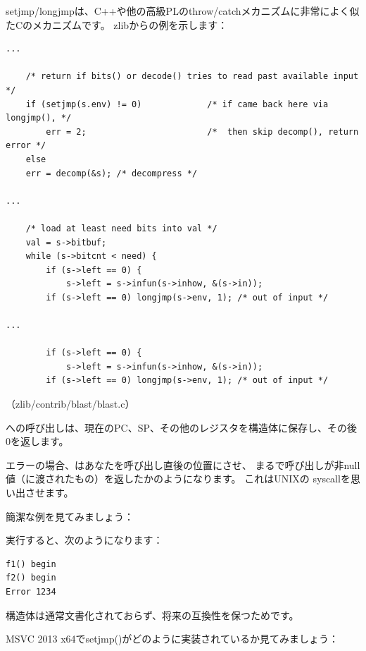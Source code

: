 

setjmp/longjmpは、C++や他の高級\ac{PL}のthrow/catchメカニズムに非常によく似たCのメカニズムです。
zlibからの例を示します：

\begin{lstlisting}[style=customc]
...

    /* return if bits() or decode() tries to read past available input */
    if (setjmp(s.env) != 0)             /* if came back here via longjmp(), */
        err = 2;                        /*  then skip decomp(), return error */
    else
	err = decomp(&s); /* decompress */

...

    /* load at least need bits into val */
    val = s->bitbuf;
    while (s->bitcnt < need) {
        if (s->left == 0) {
            s->left = s->infun(s->inhow, &(s->in));
	    if (s->left == 0) longjmp(s->env, 1); /* out of input */

...

        if (s->left == 0) {
            s->left = s->infun(s->inhow, &(s->in));
	    if (s->left == 0) longjmp(s->env, 1); /* out of input */
\end{lstlisting}
（zlib/contrib/blast/blast.c）

への呼び出しは、現在の\ac{PC}、\ac{SP}、その他のレジスタを構造体に保存し、その後0を返します。

エラーの場合、はあなたを呼び出し直後の位置にさせ、
まるで呼び出しが非null値（に渡されたもの）を返したかのようになります。
これはUNIXの syscallを思い出させます。

簡潔な例を見てみましょう：



実行すると、次のようになります：

\begin{lstlisting}
f1() begin
f2() begin
Error 1234
\end{lstlisting}

構造体は通常文書化されておらず、将来の互換性を保つためです。

MSVC 2013 x64でsetjmp()がどのように実装されているか見てみましょう：




